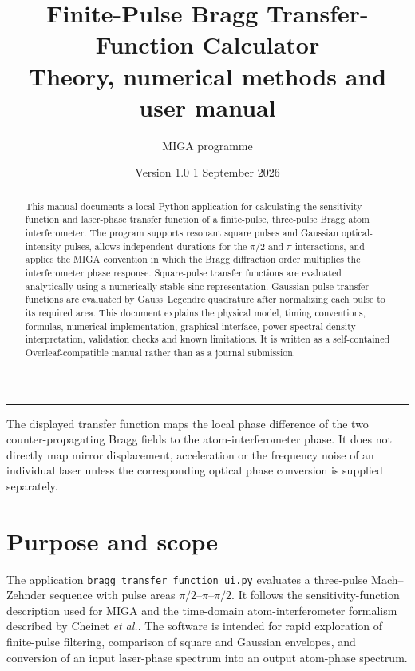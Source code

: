 \documentclass[11pt,a4paper]{article}
\title{\vspace{-1.3cm}\textbf{Finite-Pulse Bragg Transfer-Function Calculator}\\[0.35em]
\large Theory, numerical methods and user manual}
\author{MIGA programme}
\date{Version 1.0 \textbullet{} 1 September 2026}
\begin{document}
\maketitle
\begin{center}
\rule{0.92\textwidth}{0.6pt}
\end{center}

\begin{abstract}
This manual documents a local Python application for calculating the sensitivity function and laser-phase transfer function of a finite-pulse, three-pulse Bragg atom interferometer. The program supports resonant square pulses and Gaussian optical-intensity pulses, allows independent durations for the $\pi/2$ and $\pi$ interactions, and applies the MIGA convention in which the Bragg diffraction order multiplies the interferometer phase response. Square-pulse transfer functions are evaluated analytically using a numerically stable sinc representation. Gaussian-pulse transfer functions are evaluated by Gauss--Legendre quadrature after normalizing each pulse to its required area. This document explains the physical model, timing conventions, formulas, numerical implementation, graphical interface, power-spectral-density interpretation, validation checks and known limitations. It is written as a self-contained Overleaf-compatible manual rather than as a journal submission.
\end{abstract}

\begin{keybox}
The displayed transfer function maps the local phase difference of the two counter-propagating Bragg fields to the atom-interferometer phase. It does not directly map mirror displacement, acceleration or the frequency noise of an individual laser unless the corresponding optical phase conversion is supplied separately.
\end{keybox}

\tableofcontents
\clearpage

\section{Purpose and scope}

The application \texttt{bragg\_transfer\_function\_ui.py} evaluates a three-pulse Mach--Zehnder sequence with pulse areas $\pi/2$--$\pi$--$\pi/2$. It follows the sensitivity-function description used for MIGA\cite{Canuel2018} and the time-domain atom-interferometer formalism described by Cheinet \textit{et al.}\cite{Cheinet2008}. The software is intended for rapid exploration of finite-pulse filtering, comparison of square and Gaussian envelopes, and conversion of an input laser-phase spectrum into an output atom-phase spectrum.
\end{document}
